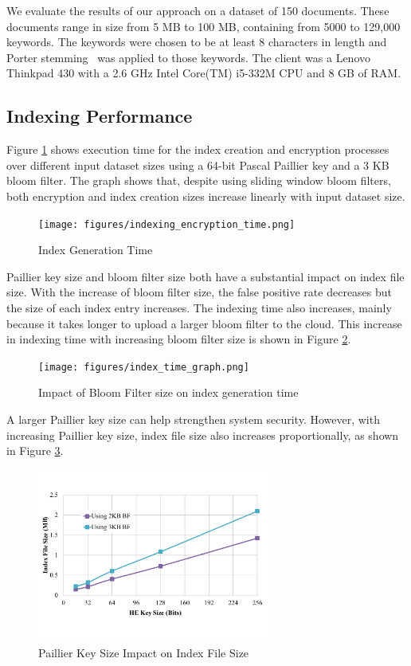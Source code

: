 We evaluate the results of our approach on a dataset of 150 documents. 
These documents range in size from 5 MB to 100 MB, containing from 5000 to
129,000 keywords. The keywords were chosen to be at least 8 characters in
length and Porter stemming~\cite{porter} was applied to those keywords.
The client was a Lenovo Thinkpad 430 with a 2.6 GHz Intel Core(TM) i5-332M
CPU and 8 GB of RAM.

\subsection{Indexing Performance}
Figure \ref{fig:Index-Generation-Time} shows execution time for the index creation
and encryption 
processes over different input dataset sizes 
using a 64-bit Pascal Paillier key and a 3 KB bloom filter. The graph shows that,
despite using sliding window bloom filters, 
both encryption and index creation sizes increase linearly with input dataset size.

\begin{figure}[h!]
  \centering
  \texttt{[image: figures/indexing\_encryption\_time.png]}
  \caption{Index Generation Time}
  \label{fig:Index-Generation-Time}
\end{figure}

Paillier key size and bloom filter size both have a substantial impact on index file size. 
With the increase of bloom filter size, the false positive rate decreases but the size of each
index entry increases. The indexing time also increases, mainly because it takes longer
to upload a larger bloom filter to the cloud. 
This increase in indexing time with increasing bloom filter size 
is shown in Figure \ref{fig: bf-size-exe-time}.

 \begin{figure}
  \centering
  \texttt{[image: figures/index\_time\_graph.png]}
  \caption{Impact of Bloom Filter size on index generation time}
  \label{fig: bf-size-exe-time}
\end{figure}

A larger Paillier key size can help strengthen system security. However, with
increasing Paillier key size, index file size also increases proportionally,
as shown in
Figure \ref{fig: pascal-size-exe-time}.

 \begin{figure}
  \centering
  \includegraphics[width= 3in]{figures/paillier_index_size_graph.png}
  \caption{Paillier Key Size Impact on Index File Size}
  \label{fig: pascal-size-exe-time}
\end{figure}

